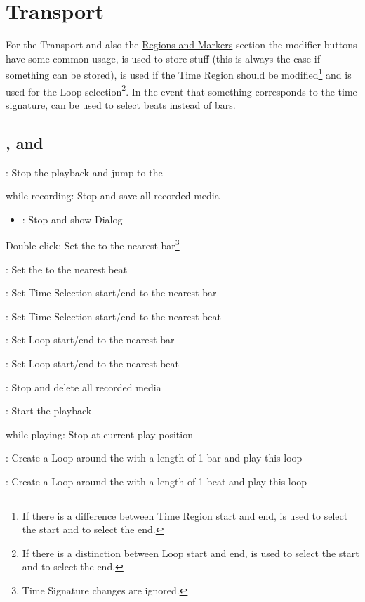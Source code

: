 \clearpage
\section{Transport}\label{transport}

For the Transport and also the \hyperref[regions]{Regions and Markers} section
the modifier buttons have some common usage, \control is used to store stuff
(this is always the case if something can be stored), \option is used
if the Time Region should be modified\footnote{If there is a difference
between Time Region start and end, \shift is used to select the start and
\option to select the end.} and \alt is used for the Loop selection\footnote{If
there is a distinction between Loop start and end, \option is used to select the
start and \alt to select the end.}. In the event that something
corresponds to the time signature, \shift can be used to select beats instead of bars.
\subsection{\play, \stopp and \cancel}
\begin{itemize}
  \item \stopp: Stop the playback and jump to the \ec
  \bemod
  \begin {compactitem}
    \item while recording: Stop and save all recorded media
    \bebemod
	\begin {itemize}
	  \item \alt: Stop and show Dialog
	\end{itemize}
	\item Double-click: Set the \ec to the nearest bar\footnote{Time
	Signature changes are ignored.}
	\bebemod
	\bebemod
	\begin {compactitem}
		\item \shift: Set the \ec to the nearest beat 
		\item \option: Set Time Selection start/end to the nearest bar
		\item \shift \option:  Set Time Selection start/end to the nearest beat
		\item \alt: Set Loop start/end to the nearest bar
		\item \shift \alt: Set Loop start/end to the nearest beat
	\end{compactitem}
  \end{compactitem}
  \item \cancel: Stop and delete all recorded media
  \item \play: Start the playback
  \bemod
  \begin {compactitem}
    \item while playing: Stop at current play position
    \item \alt: Create a Loop around the \ec with a length of 1 bar and
    play this loop
    \item \shift \alt: Create a Loop around the \ec with a length of 1
    beat and play this loop
  \end{compactitem}
\end{itemize}

